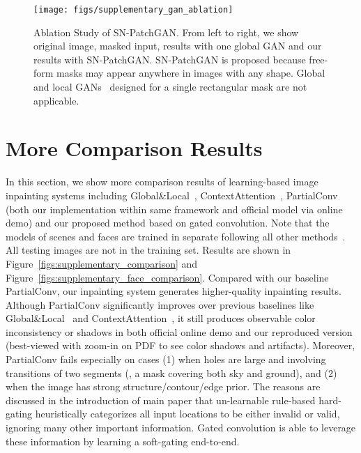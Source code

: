 \documentclass[10pt,twocolumn,letterpaper]{article}
\begin{document}
\begin{figure*}[ht]
  \centering
  \texttt{[image: figs/supplementary\_gan\_ablation]}
  \vspace*{-6mm}
  \caption{Ablation Study of SN-PatchGAN. From left to right, we show original image, masked input, results with one global GAN and our results with SN-PatchGAN. SN-PatchGAN is proposed because free-form masks may appear anywhere in images with any shape. Global and local GANs~\cite{iizuka2017globally} designed for a single rectangular mask are not applicable.}
  \label{figs:ablation_study}
\end{figure*}

\section{More Comparison Results} \label{secs:comparison}
In this section, we show more comparison results of learning-based image inpainting systems including Global\&Local~\cite{iizuka2017globally}, ContextAttention~\cite{yu2018generative}, PartialConv~\cite{liu2018image} (both our implementation within same framework and official model via online demo) and our proposed method based on gated convolution. Note that the models of scenes and faces are trained in separate following all other methods~\cite{iizuka2017globally, liu2018image, yu2018generative}. All testing images are not in the training set. Results are shown in Figure~\ref{figs:supplementary_comparison} and Figure~\ref{figs:supplementary_face_comparison}. Compared with our baseline PartialConv, our inpainting system generates higher-quality inpainting results. Although PartialConv significantly improves over previous baselines like Global\&Local~\cite{iizuka2017globally} and  ContextAttention~\cite{yu2018generative}, it still produces observable color inconsistency or shadows in both official online demo and our reproduced version (best-viewed with zoom-in on PDF to see color shadows and artifacts). Moreover, PartialConv fails especially on cases (1) when holes are large and involving transitions of two segments (\eg, a mask covering both sky and ground), and (2) when the image has strong structure/contour/edge prior. The reasons are discussed in the introduction of main paper that un-learnable rule-based hard-gating heuristically categorizes all input locations to be either invalid or valid, ignoring many other important information. Gated convolution is able to leverage these information by learning a soft-gating end-to-end.
\end{document}
